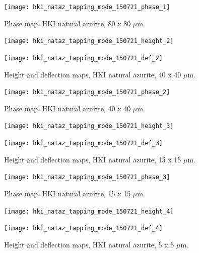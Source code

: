 \begin{figure}[H]
\centering
  \texttt{[image: hki\_nataz\_tapping\_mode\_150721\_phase\_1]}
\caption[Phase map, HKI natural azurite]{Phase map, HKI natural azurite, 80 x 80 $\mu$m.}
\label{fig:afm_hki_nataz_phase_1}
\end{figure}


\begin{figure}[H]
\centering
\begin{minipage}{.45\textwidth}
  \centering
  \texttt{[image: hki\_nataz\_tapping\_mode\_150721\_height\_2]}
\end{minipage}
\begin{minipage}{.45\textwidth}
  \centering
  \texttt{[image: hki\_nataz\_tapping\_mode\_150721\_def\_2]}
\end{minipage}
\caption[Height and deflection maps, HKI natural azurite]{Height and deflection maps, HKI natural azurite, 40 x 40 $\mu$m.}
\label{fig:afm_hki_nataz_height_def_2}
\end{figure}

\begin{figure}[H]
\centering
  \texttt{[image: hki\_nataz\_tapping\_mode\_150721\_phase\_2]}
\caption[Phase map, HKI natural azurite]{Phase map, HKI natural azurite, 40 x 40 $\mu$m.}
\label{fig:afm_hki_nataz_phase_2}
\end{figure}


\begin{figure}[H]
\centering
\begin{minipage}{.45\textwidth}
  \centering
  \texttt{[image: hki\_nataz\_tapping\_mode\_150721\_height\_3]}
\end{minipage}
\begin{minipage}{.45\textwidth}
  \centering
  \texttt{[image: hki\_nataz\_tapping\_mode\_150721\_def\_3]}
\end{minipage}
\caption[Height and deflection maps, HKI natural azurite]{Height and deflection maps, HKI natural azurite, 15 x 15 $\mu$m.}
\label{fig:afm_hki_nataz_height_def_3}
\end{figure}

\begin{figure}[H]
\centering
  \texttt{[image: hki\_nataz\_tapping\_mode\_150721\_phase\_3]}
\caption[Phase map, HKI natural azurite]{Phase map, HKI natural azurite, 15 x 15 $\mu$m.}
\label{fig:afm_hki_nataz_phase_3}
\end{figure}


\begin{figure}[H]
\centering
\begin{minipage}{.45\textwidth}
  \centering
  \texttt{[image: hki\_nataz\_tapping\_mode\_150721\_height\_4]}
\end{minipage}
\begin{minipage}{.45\textwidth}
  \centering
  \texttt{[image: hki\_nataz\_tapping\_mode\_150721\_def\_4]}
\end{minipage}
\caption[Height and deflection maps, HKI natural azurite]{Height and deflection maps, HKI natural azurite, 5 x 5 $\mu$m.}
\label{fig:afm_hki_nataz_height_def_4}
\end{figure}

